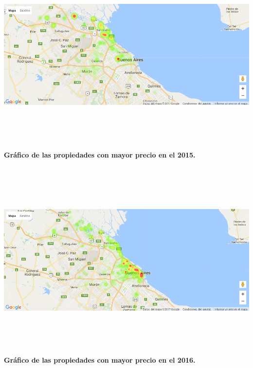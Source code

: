 \documentclass[a4paper, 10pt]{article}
\begin{document}
        \begin{center}
              \includegraphics[width=7in, height=4in]{images/ubicP2015}
              \textbf{Gráfico de las propiedades con mayor precio en el 2015.}
        \end{center}
        \begin{center}
              \includegraphics[width=7in, height=4in]{images/ubicP2016}
              \textbf{Gráfico de las propiedades con mayor precio en el 2016.}
        \end{center}
\end{document}
